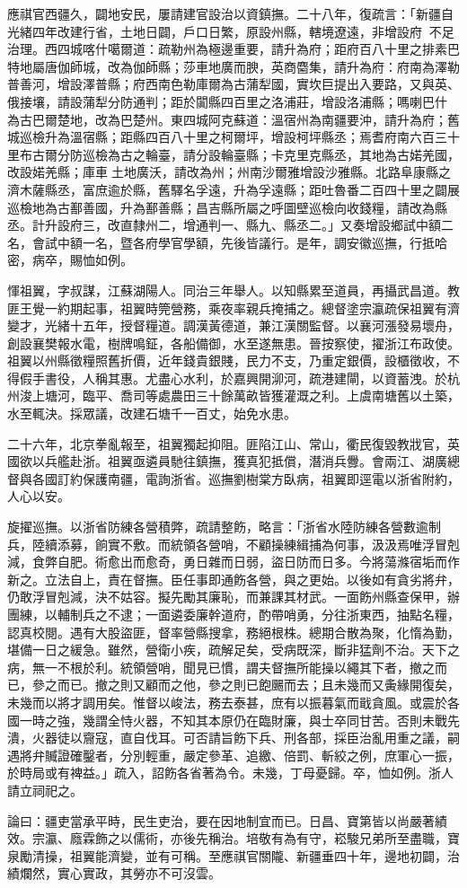 \begin{pinyinscope}
應祺官西疆久，闢地安民，屢請建官設治以資鎮撫。二十八年，復疏言：「新疆自光緒四年改建行省，土地日闢，戶口日繁，原設州縣，轄境遼遠，非增設府，不足治理。西四城喀什噶爾道：疏勒州為極邊重要，請升為府；距府百八十里之排素巴特地屬唐伽師城，改為伽師縣；莎車地廣而腴，英商麕集，請升為府：府南為澤勒普善河，增設澤普縣；府西南色勒庫爾為古蒲犁國，實坎巨提出入要路，又與英、俄接壤，請設蒲犁分防通判；距於闐縣四百里之洛浦莊，增設洛浦縣；嗎喇巴什為古巴爾楚地，改為巴楚州。東四城阿克蘇道：溫宿州為南疆要沖，請升為府；舊城巡檢升為溫宿縣；距縣四百八十里之柯爾坪，增設柯坪縣丞；焉耆府南六百三十里布古爾分防巡檢為古之輪臺，請分設輪臺縣；卡克里克縣丞，其地為古婼羌國，改設婼羌縣；庫車土地廣沃，請改為州；州南沙爾雅增設沙雅縣。北路阜康縣之濟木薩縣丞，富庶逾於縣，舊驛名孚遠，升為孚遠縣；距吐魯番二百四十里之闢展巡檢地為古鄯善國，升為鄯善縣；昌吉縣所屬之呼圖壁巡檢向收錢糧，請改為縣丞。計升設府三，改直隸州二，增通判一、縣九、縣丞二。」又奏增設鄉試中額二名，會試中額一名，暨各府學官學額，先後皆議行。是年，調安徽巡撫，行抵哈密，病卒，賜恤如例。

惲祖翼，字叔謀，江蘇湖陽人。同治三年舉人。以知縣累至道員，再攝武昌道。教匪王覺一約期起事，祖翼時筦營務，乘夜率親兵掩捕之。總督塗宗瀛疏保祖翼有濟變才，光緒十五年，授督糧道。調漢黃德道，兼江漢關監督。以襄河漲發易壞舟，創設襄樊報水電，樹牌鳴鉦，各船備御，水至遂無患。晉按察使，擢浙江布政使。祖翼以州縣徵糧照舊折價，近年錢貴銀賤，民力不支，乃重定銀價，設櫃徵收，不得假手書役，人稱其惠。尤盡心水利，於嘉興開泖河，疏港建閘，以資蓄洩。於杭州浚上塘河，臨平、喬司等處農田三十餘萬畝皆獲灌溉之利。上虞南塘舊以土築，水至輒決。採眾議，改建石塘千一百丈，始免水患。

二十六年，北京拳亂報至，祖翼獨起抑阻。匪陷江山、常山，衢民復毀教戕官，英國欲以兵艦赴浙。祖翼亟遴員馳往鎮撫，獲真犯抵償，潛消兵釁。會兩江、湖廣總督與各國訂約保護南疆，電詢浙省。巡撫劉樹棠方臥病，祖翼即逕電以浙省附約，人心以安。

旋擢巡撫。以浙省防練各營積弊，疏請整飭，略言：「浙省水陸防練各營數逾制兵，陸續添募，餉實不敷。而統領各營哨，不顧操練緝捕為何事，汲汲焉唯浮冒剋減，食弊自肥。術愈出而愈奇，勇日雜而日弱，盜日防而日多。今將蕩滌宿垢而作新之。立法自上，責在督撫。臣任事即通飭各營，與之更始。以後如有貪劣將弁，仍敢浮冒剋減，決不姑容。擬先勵其廉恥，而兼課其材武。一面飭州縣查保甲，辦團練，以輔制兵之不逮；一面遴委廉幹道府，酌帶哨勇，分往浙東西，抽點名糧，認真校閱。遇有大股盜匪，督率營縣搜拿，務絕根株。總期合散為聚，化惰為勤，堪備一日之緩急。雖然，營衛小疾，疏解足矣，受病既深，斷非猛劑不治。天下之病，無一不根於利。統領營哨，聞見已慣，謂夫督撫所能操以繩其下者，撤之而已，參之而已。撤之則又顧而之他，參之則已飽颺而去；且未幾而又夤緣開復矣，未幾而以將才調用矣。惟督以峻法，務去泰甚，庶有以振暮氣而戢貪風。或震於各國一時之強，幾謂全恃火器，不知其本原仍在臨財廉，與士卒同甘苦。否則未戰先潰，火器徒以齎寇，直自伐耳。可否請旨飭下兵、刑各部，採臣治亂用重之議，嗣遇將弁贓證確鑿者，分別輕重，嚴定參革、追繳、倍罰、斬絞之例，庶軍心一振，於時局或有裨益。」疏入，詔飭各省著為令。未幾，丁母憂歸。卒，恤如例。浙人請立祠祀之。

論曰：疆吏當承平時，民生吏治，要在因地制宜而已。日昌、寶第皆以尚嚴著績效。宗瀛、廕霖飾之以儒術，亦後先稱治。培敬有為有守，崧駿兄弟所至盡職，寶泉勵清操，祖翼能濟變，並有可稱。至應祺官關隴、新疆垂四十年，邊地初闢，治績爛然，實心實政，其勞亦不可沒雲。


\end{pinyinscope}